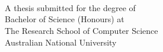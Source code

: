 
\begin{titlepage}
  \enlargethispage{2cm}
  \begin{center}
    \makeatletter
    \Huge\textbf{\@title} \\[.4cm]
    \Huge\textbf{\thesisqualifier} \\[2.5cm]
    \huge\textbf{\@author} \\[9cm]
    \makeatother
    \LARGE A thesis submitted for the degree of \\
    Bachelor of Science (Honours) at \\
    The Research School of Computer Science\\
    Australian National University \\[2cm]
    \thismonth
  \end{center}
\end{titlepage}

